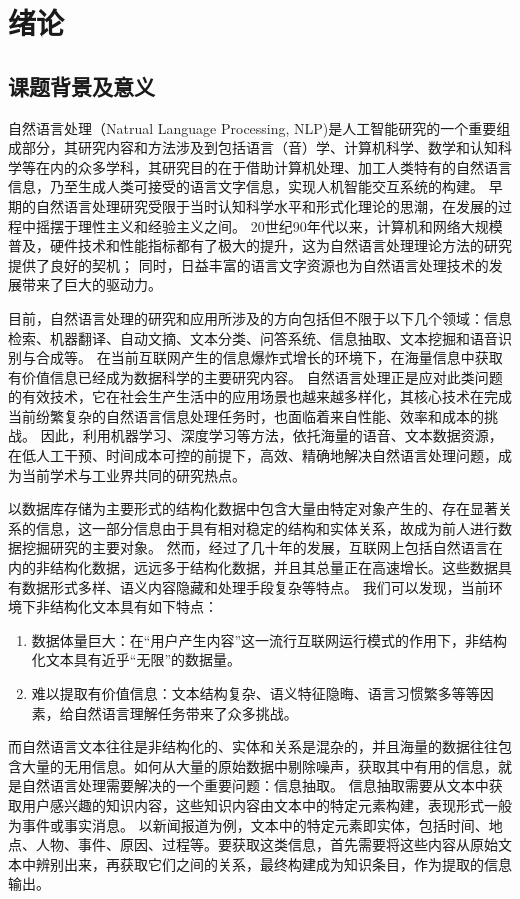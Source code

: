 \chapter{绪论}
\label{chap:introduction}
\section{课题背景及意义}
自然语言处理（Natrual Language Processing, NLP)是人工智能研究的一个重要组成部分，其研究内容和方法涉及到包括语言（音）学、计算机科学、数学和认知科学等在内的众多学科，其研究目的在于借助计算机处理、加工人类特有的自然语言信息，乃至生成人类可接受的语言文字信息，实现人机智能交互系统的构建。
早期的自然语言处理研究受限于当时认知科学水平和形式化理论的思潮，在发展的过程中摇摆于理性主义和经验主义之间。
20世纪90年代以来，计算机和网络大规模普及，硬件技术和性能指标都有了极大的提升，这为自然语言处理理论方法的研究提供了良好的契机；
同时，日益丰富的语言文字资源也为自然语言处理技术的发展带来了巨大的驱动力。

目前，自然语言处理的研究和应用所涉及的方向包括但不限于以下几个领域：信息检索、机器翻译、自动文摘、文本分类、问答系统、信息抽取、文本挖掘和语音识别与合成等。
在当前互联网产生的信息爆炸式增长的环境下，在海量信息中获取有价值信息已经成为数据科学的主要研究内容。
自然语言处理正是应对此类问题的有效技术，它在社会生产生活中的应用场景也越来越多样化，其核心技术在完成当前纷繁复杂的自然语言信息处理任务时，也面临着来自性能、效率和成本的挑战。
因此，利用机器学习、深度学习等方法，依托海量的语音、文本数据资源，在低人工干预、时间成本可控的前提下，高效、精确地解决自然语言处理问题，成为当前学术与工业界共同的研究热点。

以数据库存储为主要形式的结构化数据中包含大量由特定对象产生的、存在显著关系的信息，这一部分信息由于具有相对稳定的结构和实体关系，故成为前人进行数据挖掘研究的主要对象。
然而，经过了几十年的发展，互联网上包括自然语言在内的非结构化数据，远远多于结构化数据，并且其总量正在高速增长。这些数据具有数据形式多样、语义内容隐藏和处理手段复杂等特点。
我们可以发现，当前环境下非结构化文本具有如下特点：
\begin{enumerate}[\indent(1)]
    \item 数据体量巨大：在“用户产生内容”这一流行互联网运行模式的作用下，非结构化文本具有近乎“无限”的数据量。
    \item 难以提取有价值信息：文本结构复杂、语义特征隐晦、语言习惯繁多等等因素，给自然语言理解任务带来了众多挑战。
\end{enumerate}
而自然语言文本往往是非结构化的、实体和关系是混杂的，并且海量的数据往往包含大量的无用信息。如何从大量的原始数据中剔除噪声，获取其中有用的信息，就是自然语言处理需要解决的一个重要问题：信息抽取。
信息抽取需要从文本中获取用户感兴趣的知识内容，这些知识内容由文本中的特定元素构建，表现形式一般为事件或事实消息。
以新闻报道为例，文本中的特定元素即实体，包括时间、地点、人物、事件、原因、过程等。要获取这类信息，首先需要将这些内容从原始文本中辨别出来，再获取它们之间的关系，最终构建成为知识条目，作为提取的信息输出。

